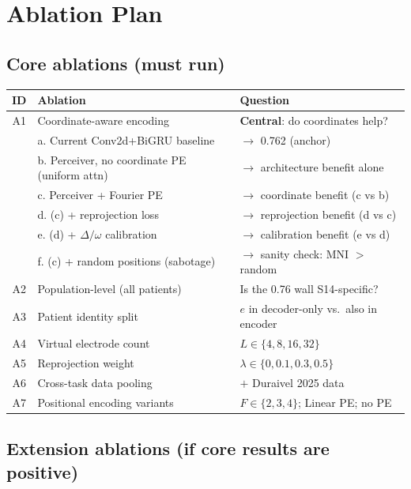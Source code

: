 \documentclass[11pt,letterpaper]{article}
\begin{document}
\section{Ablation Plan}\label{sec:ablations}

\subsection{Core ablations (must run)}

\begin{table}[ht!]\centering\small
\begin{tabular}{@{}clp{6.5cm}@{}}
\toprule
\textbf{ID} & \textbf{Ablation} & \textbf{Question} \\
\midrule
A1 & Coordinate-aware encoding & \textbf{Central}: do coordinates help? \\
 & \quad a. Current Conv2d+BiGRU baseline & $\to$ 0.762 (anchor) \\
 & \quad b. Perceiver, no coordinate PE (uniform attn) & $\to$ architecture benefit alone \\
 & \quad c. Perceiver + Fourier PE & $\to$ coordinate benefit (c vs b) \\
 & \quad d. (c) + reprojection loss & $\to$ reprojection benefit (d vs c) \\
 & \quad e. (d) + $\Delta/\omega$ calibration & $\to$ calibration benefit (e vs d) \\
 & \quad f. (c) + random positions (sabotage) & $\to$ sanity check: MNI $>$ random \\
\midrule
A2 & Population-level (all patients) & Is the 0.76 wall S14-specific? \\
A3 & Patient identity split & $e$ in decoder-only vs.\ also in encoder \\
A4 & Virtual electrode count & $L \in \{4, 8, 16, 32\}$ \\
A5 & Reprojection weight & $\lambda \in \{0, 0.1, 0.3, 0.5\}$ \\
A6 & Cross-task data pooling & $+$ Duraivel 2025 data \\
A7 & Positional encoding variants & $F \in \{2, 3, 4\}$; Linear PE; no PE \\
\bottomrule
\end{tabular}
\end{table}

\subsection{Extension ablations (if core results are positive)}
\end{document}
